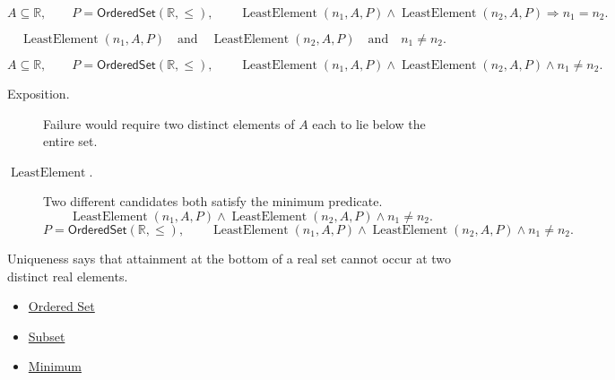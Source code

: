 \begin{remark*}
\[
  A\subseteq\mathbb{R},\qquad P=\mathsf{OrderedSet}(\mathbb{R},\leq),\qquad
  \operatorname{LeastElement}(n_{1},A,P)\land
  \operatorname{LeastElement}(n_{2},A,P)
  \Longrightarrow n_{1}=n_{2}.
\]
\end{remark*}

\begin{remark*}
\[
  \operatorname{LeastElement}(n_{1},A,P)
  \quad\text{and}\quad
  \operatorname{LeastElement}(n_{2},A,P)
  \quad\text{and}\quad
  n_{1}\neq n_{2}.
\]
\end{remark*}

\begin{remark*}
\[
  A\subseteq\mathbb{R},\qquad P=\mathsf{OrderedSet}(\mathbb{R},\leq),\qquad
  \operatorname{LeastElement}(n_{1},A,P)\land
  \operatorname{LeastElement}(n_{2},A,P)\land n_{1}\neq n_{2}.
\]
\end{remark*}

\begin{remark*}
\begin{description}
  \item[Exposition.]
  Failure would require two distinct elements of $A$ each to lie below the
  entire set.

  \item[\(\operatorname{LeastElement}.\)]
  Two different candidates both satisfy the minimum predicate.
  \[
    \operatorname{LeastElement}(n_{1},A,P)\land
    \operatorname{LeastElement}(n_{2},A,P)\land n_{1}\neq n_{2}.
  \]
  \[
    P=\mathsf{OrderedSet}(\mathbb{R},\leq),\qquad
    \operatorname{LeastElement}(n_{1},A,P)\land
    \operatorname{LeastElement}(n_{2},A,P)\land n_{1}\neq n_{2}.
  \]
\end{description}
\end{remark*}

\begin{remark*}[Interpretation]
Uniqueness says that attainment at the bottom of a real set cannot occur
at two distinct real elements.
\end{remark*}

\begin{dependencies}
\begin{itemize}
  \item \hyperref[def:ordered-set]{Ordered Set}
  \item \hyperref[def:subset]{Subset}
  \item \hyperref[def:minimum]{Minimum}
\end{itemize}
\end{dependencies}

